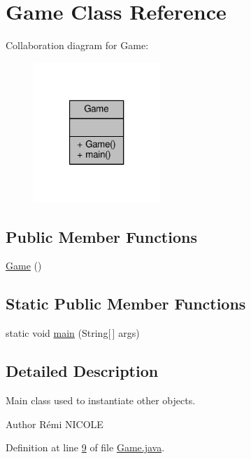 \hypertarget{classGame}{\section{Game Class Reference}
\label{classGame}
}


Collaboration diagram for Game\-:
\nopagebreak
\begin{figure}[H]
\begin{center}
\leavevmode
\includegraphics[width=136pt]{classGame__coll__graph}
\end{center}
\end{figure}
\subsection*{Public Member Functions}
\begin{DoxyCompactItemize}
\item 
\hyperlink{classGame_a2e034e53e9c032964ecd2a831b29a616}{Game} ()
\end{DoxyCompactItemize}
\subsection*{Static Public Member Functions}
\begin{DoxyCompactItemize}
\item 
static void \hyperlink{classGame_ae52595a27ac1b327b05db2129ad81fca}{main} (String\mbox{[}$\,$\mbox{]} args)
\end{DoxyCompactItemize}


\subsection{Detailed Description}
Main class used to instantiate other objects. \begin{DoxyAuthor}{Author}
Rémi N\-I\-C\-O\-L\-E 
\end{DoxyAuthor}


Definition at line \hyperlink{Game_8java_source_l00009}{9} of file \hyperlink{Game_8java_source}{Game.\-java}.



